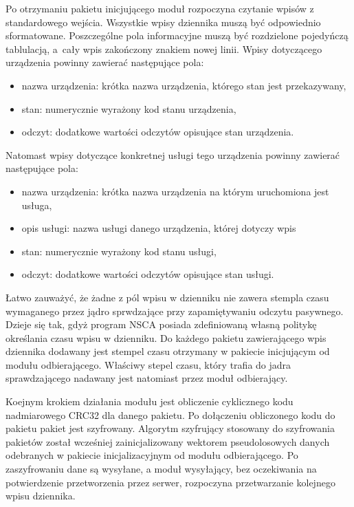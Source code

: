 Po otrzymaniu pakietu inicjującego moduł rozpoczyna czytanie wpisów z
standardowego wejścia. Wszystkie wpisy dziennika muszą być odpowiednio
sformatowane. Poszczególne pola informacyjne muszą być rozdzielone
pojedyńczą tablulacją, a~cały wpis zakończony znakiem nowej
linii. Wpisy dotyczącego urządzenia powinny zawierać następujące pola:

\begin{itemize}
\item nazwa urządzenia: krótka nazwa urządzenia, którego stan jest
  przekazywany,
\item stan: numerycznie wyrażony kod stanu urządzenia,
\item odczyt: dodatkowe wartości odczytów opisujące stan urządzenia.
\end{itemize}

Natomast wpisy dotyczące konkretnej usługi tego urządzenia powinny
zawierać następujące pola:

\begin{itemize}
\item nazwa urządzenia: krótka nazwa urządzenia na którym uruchomiona
  jest usługa,
\item opis usługi: nazwa usługi danego urządzenia, której dotyczy wpis
\item stan: numerycznie wyrażony kod stanu usługi,
\item odczyt: dodatkowe wartości odczytów opisujące stan usługi.
\end{itemize}

Łatwo zauważyć, że żadne z pól wpisu w dzienniku nie zawera stempla
czasu wymaganego przez jądro sprwdzające przy zapamiętywaniu odczytu
pasywnego. Dzieje się tak, gdyż program NSCA posiada zdefiniowaną
własną politykę określania czasu wpisu w dzienniku. Do każdego pakietu
zawierającego wpis dziennika dodawany jest stempel czasu otrzymany w
pakiecie inicjującym od modułu odbierającego. Właściwy stepel czasu,
który trafia do jadra sprawdzającego nadawany jest natomiast przez
moduł odbierający.

Koejnym krokiem działania modułu jest obliczenie cyklicznego kodu
nadmiarowego CRC32 dla danego pakietu. Po dołączeniu obliczonego kodu
do pakietu pakiet jest szyfrowany. Algorytm szyfrujący stosowany do
szyfrowania pakietów został wcześniej zainicjalizowany wektorem
pseudolosowych danych odebranych w pakiecie inicjalizacyjnym od modułu
odbierającego. Po zaszyfrowaniu dane są wysyłane, a moduł wysyłający,
bez oczekiwania na potwierdzenie przetworzenia przez serwer,
rozpoczyna przetwarzanie kolejnego wpisu dziennika.

